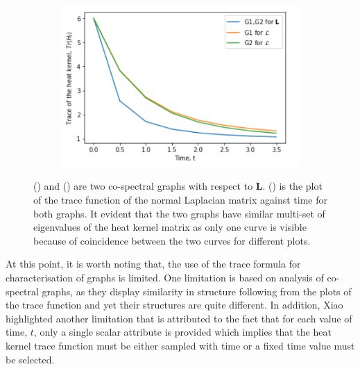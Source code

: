 \documentclass[10pt,a4paper]{article}
\theoremstyle{plain}
\theoremstyle{definition}
\begin{document}
\begin{figure}[H]
\begin{subfigure}[b]{0.30\textwidth}
        		\caption{}
        		\label{cospectralgraph2}
        	\end{subfigure}~
        	\begin{subfigure}[b]{0.35\textwidth}
        		\includegraphics[width= \textwidth]{images/trace-isospectral.png}
        		\caption{}
        		\label{cospectracegraphplot}
        	\end{subfigure}
        	\caption{() and ()  are two co-spectral graphs with respect to $\mathbf{L}$. () is the plot of the trace function of the normal Laplacian matrix against time for both graphs. It evident that the two graphs have similar multi-set of eigenvalues of the heat kernel matrix as only one curve is visible because of coincidence between the two curves for different plots. }
        	\label{TraceCospectral}
        \end{figure}
        
        At this point, it is worth noting that, the use of the trace formula for characterisation of graphs is limited. One limitation is based on analysis of co-spectral graphs, as they display similarity in structure following from the plots of the trace function and yet their structures are quite different. In addition, Xiao \citep{xiao2009graph} highlighted another limitation that is attributed to the fact that for each value of time, $t$, only a single scalar attribute is provided which implies that the heat kernel trace function must be either sampled with time or a fixed time value must be selected.  
        
\end{document}
